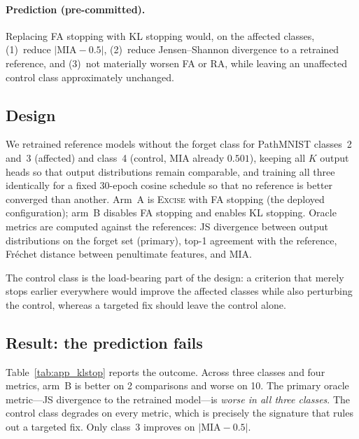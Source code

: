 \documentclass{article}
\newcommand{\ours}{\textsc{Excise}}
\theoremstyle{remark}
\theoremstyle{plain}
\begin{document}
\paragraph{Prediction (pre-committed).} Replacing FA stopping with KL stopping
would, on the affected classes, (1)~reduce $|\mathrm{MIA}-0.5|$, (2)~reduce
Jensen--Shannon divergence to a retrained reference, and (3)~not materially
worsen FA or RA, while leaving an unaffected control class approximately
unchanged.

\subsection{Design}

We retrained reference models without the forget class for PathMNIST classes~2
and~3 (affected) and class~4 (control, MIA already $0.501$), keeping all $K$
output heads so that output distributions remain comparable, and training all
three identically for a fixed 30-epoch cosine schedule so that no reference is
better converged than another. Arm~A is \ours{} with FA stopping (the deployed
configuration); arm~B disables FA stopping and enables KL stopping. Oracle
metrics are computed against the references: JS divergence between output
distributions on the forget set (primary), top-1 agreement with the reference,
Fr\'echet distance between penultimate features, and MIA.

The control class is the load-bearing part of the design: a criterion that
merely stops earlier everywhere would improve the affected classes while also
perturbing the control, whereas a targeted fix should leave the control alone.

\subsection{Result: the prediction fails}

Table~\ref{tab:app_klstop} reports the outcome. Across three classes and four
metrics, arm~B is better on 2 comparisons and worse on 10. The primary oracle
metric---JS divergence to the retrained model---is \emph{worse in all three
classes}. The control class degrades on every metric, which is precisely the
signature that rules out a targeted fix. Only class~3 improves on
$|\mathrm{MIA}-0.5|$.
\end{document}
